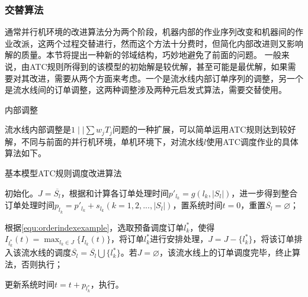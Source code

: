 \subsubsection{交替算法}
通常并行机环境的改进算法分为两个阶段，机器内部的作业序列改变和机器间的作业改派，这两个过程交替进行\cite{史烨2011}，然而这个方法十分费时，但简化内部改进则又影响解的质量。本节将提出一种新的邻域结构，巧妙地避免了前面的问题。
一般来说，由ATC规则所得到的该模型的初始解是较优解，甚至可能是最优解，如果需要对其改进，需要从两个方面来考虑。一个是流水线内部订单序列的调整，另一个是流水线间的订单调整，这两种调整涉及两种元启发式算法，需要交替使用。
\begin{asparaenum}
\item 内部调整

流水线内部调整是$1\mid\mid \sum w_jT_j$问题的一种扩展，可以简单运用ATC规则达到较好解，不同与前面的并行机环境，单机环境下，对流水线$l$使用ATC调度作业的具体算法如下。

\begin{algori}
基本模型ATC规则调度改进算法\label{alg:atcinner}
\begin{asparaenum}
\renewcommand{\labelenumi}{\bf Step\theenumi~}
\item 初始化。$J = \overline{S_l}$，根据和计算各订单处理时间$p'_{l_k} = g({l_k}, |S_l|)$，进一步得到整合订单处理时间$p_{l_k} = p'_{l_k} + s_{l_k}(k = 1,2,...,|S_l|)$，置系统时间$t = 0$，重置$\overline{S_l} = \varnothing$；
\item 根据\eqref{equ:orderindexexample}，选取预备调度订单$l_k^*$，使得$I_{l_k^*}(t) = \displaystyle\max_{l_k\in J}\{I_{l_k}(t)\}$，将订单$l_k^*$进行安排处理，$J = J -\{l_k^*\}$，将该订单排入该流水线的调度$\overline{S_l} = \overline{S_l}\bigcup \{l_k^*\} $。若$J = \varnothing$，该流水线上的订单调度完毕，终止算法，否则执行；
\item 更新系统时间$t = t + p_{l_k^*}$，执行。
\end{asparaenum}
\end{algori}


\end{asparaenum}
